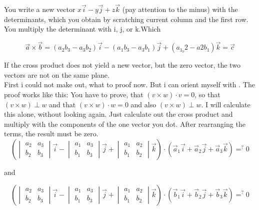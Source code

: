 \documentclass[a4paper]{article}
\begin{document}
You write a new vector $x\vec{i}-y\vec{j}+z\vec{k}$ (pay attention to the minus) with the determinants, which you obtain by scratching current column and the first row. You multiply the determinant with i, j, or k.Which

\begin{displaymath}
    \vec{a} \times \vec{b} = (a_{2}b_{3}-a_{3}b_{2})\vec{i} - (a_{1}b_{3}-a_{3}b_{1})\vec{j} + (a_{1}_b{2}-a{2}b_{1})\vec{k} = \vec{c}
\end{displaymath}

If the cross product does not yield a new vector, but the  zero vector, the two vectors are not on the same plane.\\

First i could not make out, what to proof now. But i can orient myself with \cite{Corral1}. The proof works like this: You have to prove, that $(v \times w) \cdot v = 0$, so that $(v \times w) \perp w$ and that $(v \times w) \cdot w = 0$ and also $(v \times w) \perp w$. I will calculate this alone, without looking again. Just calculate out the cross product and multiply with the components of the one vector you dot. After rearranging the terms, the result must be zero.\\

\begin{displaymath}
\left(\begin{vmatrix}
a_2 & a_3 \\
b_2 & b_3 
\end{vmatrix} \vec{i} - \begin{vmatrix}a_1 & a_3\\ b_1 & b_3\end{vmatrix} \vec{j} + \begin{vmatrix}a_1 & a_2\\b_1 & b_2\end{vmatrix} \vec{k}\right) \cdot \left(\vec{a}_{1}\vec{i} + \vec{a}_{2}\vec{j} + \vec{a}_{3}\vec{k}\right) =\nolimits^{?} 0
\end{displaymath}

and

\begin{displaymath}
\left(\begin{vmatrix}
a_2 & a_3 \\
b_2 & b_3 
\end{vmatrix} \vec{i} - \begin{vmatrix}a_1 & a_3\\ b_1 & b_3\end{vmatrix} \vec{j} + \begin{vmatrix}a_1 & a_2\\b_1 & b_2\end{vmatrix} \vec{k}\right) \cdot \left(\vec{b}_{1}\vec{i} + \vec{b}_{2}\vec{j} + \vec{b}_{3}\vec{k}\right) =\nolimits^{?} 0
\end{displaymath}
\end{document}
